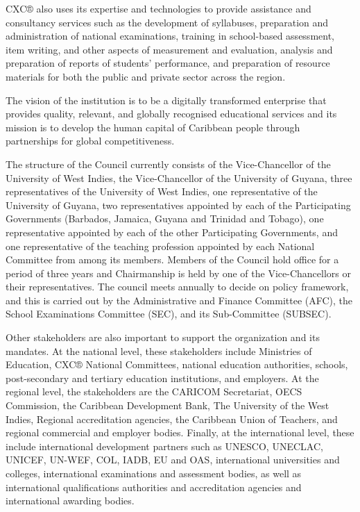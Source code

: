 \documentclass[
  10pt,
]{book}
\begin{document}
CXC® also uses its expertise and technologies to provide assistance and consultancy services such as the development of syllabuses, preparation and administration of national examinations, training in school-based assessment, item writing, and other aspects of measurement and evaluation, analysis and preparation of reports of students' performance, and preparation of resource materials for both the public and private sector across the region.

The vision of the institution is to be a digitally transformed enterprise that provides quality, relevant, and globally recognised educational services and its mission is to develop the human capital of Caribbean people through partnerships for global competitiveness.

The structure of the Council currently consists of the Vice-Chancellor of the University of West Indies, the Vice-Chancellor of the University of Guyana, three representatives of the University of West Indies, one representative of the University of Guyana, two representatives appointed by each of the Participating Governments (Barbados, Jamaica, Guyana and Trinidad and Tobago), one representative appointed by each of the other Participating Governments, and one representative of the teaching profession appointed by each National Committee from among its members. Members of the Council hold office for a period of three years and Chairmanship is held by one of the Vice-Chancellors or their representatives. The council meets annually to decide on policy framework, and this is carried out by the Administrative and Finance Committee (AFC), the School Examinations Committee (SEC), and its Sub-Committee (SUBSEC).

Other stakeholders are also important to support the organization and its mandates. At the national level, these stakeholders include Ministries of Education, CXC® National Committees, national education authorities, schools, post-secondary and tertiary education institutions, and employers. At the regional level, the stakeholders are the CARICOM Secretariat, OECS Commission, the Caribbean Development Bank, The University of the West Indies, Regional accreditation agencies, the Caribbean Union of Teachers, and regional commercial and employer bodies. Finally, at the international level, these include international development partners such as UNESCO, UNECLAC, UNICEF, UN-WEF, COL, IADB, EU and OAS, international universities and colleges, international examinations and assessment bodies, as well as international qualifications authorities and accreditation agencies and international awarding bodies.
\end{document}

